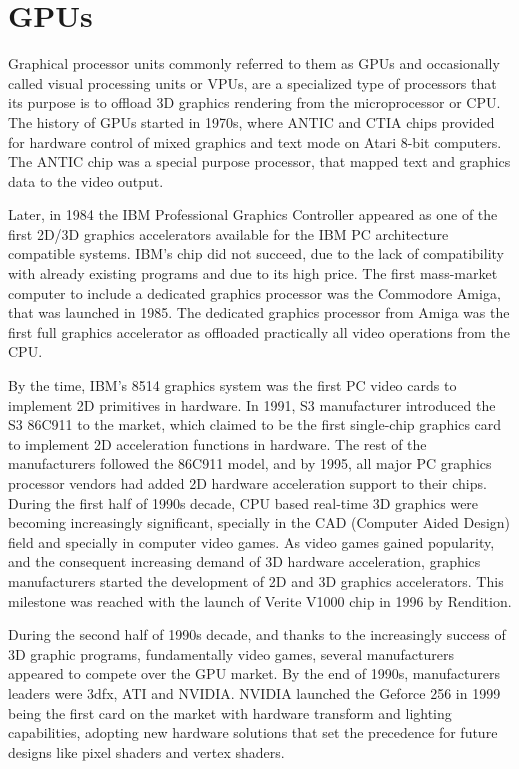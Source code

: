 \documentclass[thesis=M,english]{FITthesis}[2011/07/15]
\begin{document}
\section{GPUs}
Graphical processor units commonly referred to them as GPUs and occasionally called visual processing units or VPUs, are a specialized type of processors that its purpose is to offload 3D graphics rendering from the microprocessor or CPU. The history of GPUs started in 1970s, where ANTIC and CTIA chips provided for hardware control of mixed graphics and text mode on Atari 8-bit computers. The ANTIC chip was a special purpose processor, that mapped text and graphics data to the video output.

Later, in 1984 the IBM Professional Graphics Controller appeared as one of the first 2D/3D graphics accelerators available for the IBM PC architecture compatible systems. IBM’s chip did not succeed, due to the lack of compatibility with already existing programs and due to its high price. The first mass-market computer to include a dedicated graphics processor was the Commodore Amiga, that was launched in 1985. The dedicated graphics processor from Amiga was the first full graphics accelerator as offloaded practically all video operations from the CPU.

By the time, IBM’s 8514 graphics system was the first PC video cards to implement 2D primitives in hardware. In 1991, S3 manufacturer introduced the S3 86C911 to the market, which claimed to be the first single-chip graphics card to implement 2D acceleration functions in hardware. The rest of the manufacturers followed the 86C911 model, and by 1995, all major PC graphics processor vendors had added 2D hardware acceleration support to their chips. During the first half of 1990s decade, CPU based real-time 3D graphics were becoming increasingly significant, specially in the CAD (Computer Aided Design) field and specially in computer video games. As video games gained popularity, and the consequent increasing demand of 3D hardware acceleration, graphics manufacturers started the development of 2D and 3D graphics accelerators. This milestone was reached with the launch of Verite V1000 chip in 1996 by Rendition.

During the second half of 1990s decade, and thanks to the increasingly success of 3D graphic programs, fundamentally video games, several manufacturers appeared to compete over the GPU market. By the end of 1990s, manufacturers leaders were 3dfx, ATI and NVIDIA. NVIDIA launched the Geforce 256 in 1999 being the first card on the market with hardware transform and lighting capabilities, adopting new hardware solutions that set the precedence for future designs like pixel shaders and vertex shaders. 
\end{document}
